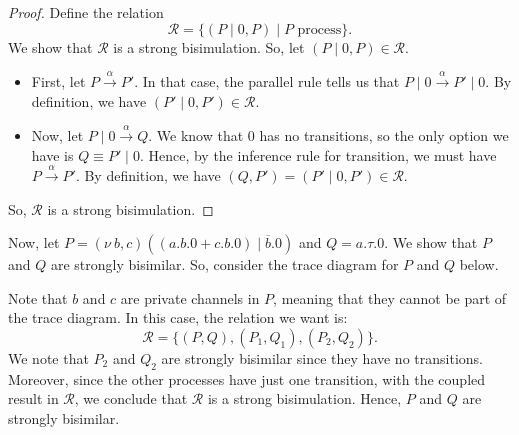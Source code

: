 \documentclass[a4paper, openany]{memoir}
\theoremstyle{definition}
\begin{document}
    \begin{proof}
        Define the relation
        \[\mathcal{R} = \{(P \mid 0, P) \mid P \textrm{ process}\}.\]
        We show that $\mathcal{R}$ is a strong bisimulation. So, let $(P \mid 0, P) \in \mathcal{R}$. 
        \begin{itemize}
            \item First, let $P \xrightarrow{\alpha} P'$. In that case, the parallel rule tells us that $P \mid 0 \xrightarrow{\alpha} P' \mid 0$. By definition, we have $(P' \mid 0, P') \in \mathcal{R}$.

            \item Now, let $P \mid 0 \xrightarrow{\alpha} Q$. We know that $0$ has no transitions, so the only option we have is $Q \equiv P' \mid 0$. Hence, by the inference rule for transition, we must have $P \xrightarrow{\alpha} P'$. By definition, we have $(Q, P') = (P' \mid 0, P') \in \mathcal{R}$.
        \end{itemize}
        So, $\mathcal{R}$ is a strong bisimulation.
    \end{proof}

    Now, let $P = (\nu \ b, c)((a.b.0 + c.b.0) \mid \overline{b}.0)$ and $Q = a.\tau.0$. We show that $P$ and $Q$ are strongly bisimilar. So, consider the trace diagram for $P$ and $Q$ below.
    \begin{figure}[H]
        \centering
    \end{figure}
    \noindent Note that $b$ and $c$ are private channels in $P$, meaning that they cannot be part of the trace diagram. In this case, the relation we want is:
    \[\mathcal{R} = \{(P, Q), (P_1, Q_1), (P_2, Q_2)\}.\]
    We note that $P_2$ and $Q_2$ are strongly bisimilar since they have no transitions. Moreover, since the other processes have just one transition, with the coupled result in $\mathcal{R}$, we conclude that $\mathcal{R}$ is a strong bisimulation. Hence, $P$ and $Q$ are strongly bisimilar.
\end{document}
